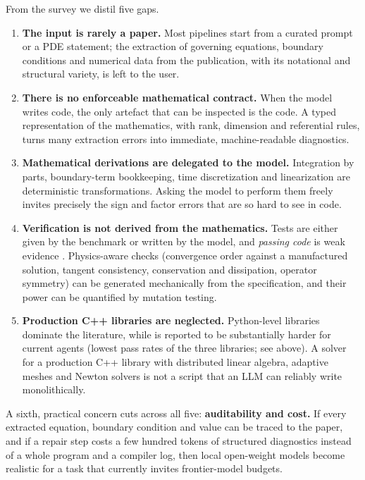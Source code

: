 From the survey we distil five gaps.
\begin{enumerate}[label=\textbf{G\arabic*.},leftmargin=*]
\item \textbf{The input is rarely a paper.} Most pipelines start from a curated prompt or a PDE statement; the extraction of governing equations, boundary conditions and numerical data from the publication, with its notational and structural variety, is left to the user.
\item \textbf{There is no enforceable mathematical contract.} When the model writes code, the only artefact that can be inspected is the code. A typed representation of the mathematics, with rank, dimension and referential rules, turns many extraction errors into immediate, machine-readable diagnostics.
\item \textbf{Mathematical derivations are delegated to the model.} Integration by parts, boundary-term bookkeeping, time discretization and linearization are deterministic transformations. Asking the model to perform them freely invites precisely the sign and factor errors that are so hard to see in code.
\item \textbf{Verification is not derived from the mathematics.} Tests are either given by the benchmark or written by the model, and \emph{passing code} is weak evidence \citep{fembench2025}. Physics-aware checks (convergence order against a manufactured solution, tangent consistency, conservation and dissipation, operator symmetry) can be generated mechanically from the specification, and their power can be quantified by mutation testing.
\item \textbf{Production C++ libraries are neglected.} Python-level libraries dominate the literature, while \dealii{} is reported to be substantially harder for current agents \citep{pdeagentbench2026} (lowest pass rates of the three libraries; see above). A solver for a production C++ library with distributed linear algebra, adaptive meshes and Newton solvers is not a script that an LLM can reliably write monolithically.
\end{enumerate}
A sixth, practical concern cuts across all five: \textbf{auditability and cost.} If every extracted equation, boundary condition and value can be traced to the paper, and if a repair step costs a few hundred tokens of structured diagnostics instead of a whole program and a compiler log, then local open-weight models become realistic for a task that currently invites frontier-model budgets.

